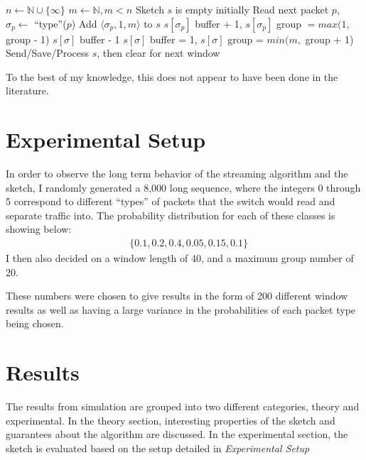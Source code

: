 \documentclass[conference]{IEEEtran}
\begin{document}
 \begin{algorithm}
    \caption{$\mathcal{A}$}
    \small
    \begin{algorithmic}[1]
      \State $n \gets \mathbb{N}\cup\{\infty\}$ 
      \State $m \gets \mathbb{N}, m < n$ 
      \State Sketch $s$ is empty initially
         
          \State Read next packet $p$, $\sigma_p \gets$ ``type''($p$) 
            \State Add $\langle \sigma_p, 1, m  \rangle$ to $s$ 
            \Else
            \State $s[\sigma_p]$ buffer + 1, $s[\sigma_p]$ group $= max(1,$ group - 1)
          \EndIf
            \State $s[\sigma]$ buffer - 1
              \State $s[\sigma]$ buffer = 1, $s[\sigma]$ group = $min(m,$ group + 1)
            \EndIf
          \EndFor
        \EndFor
        \State Send/Save/Process $s$, then clear for next window  
      \EndWhile
    \end{algorithmic}
  \end{algorithm}

To the best of my knowledge, this does not appear to have been done in the literature.

\section{Experimental Setup}
In order to observe the long term behavior of the streaming algorithm and the sketch, I randomly generated a 8,000 long sequence, where the integers 0 through 5 correspond to different ``types'' of packets that the switch would read and separate traffic into.  The probability distribution for each of these classes is showing below:
\begin{align}
 &\{0.1,0.2,0.4,0.05,0.15,0.1\}
 \end{align}
I then also decided on a window length of 40, and a maximum group number of 20.

These numbers were chosen to give results in the form of 200 different window
results as well as having a large variance in the probabilities of each packet
type being chosen.

\section{Results}
The results from simulation are grouped into two different categories, theory and experimental.  In the theory section, interesting properties of the sketch and guarantees about the algorithm are discussed.  In the experimental section, the sketch is evaluated based on the setup detailed in \textit{Experimental Setup}
\end{document}
